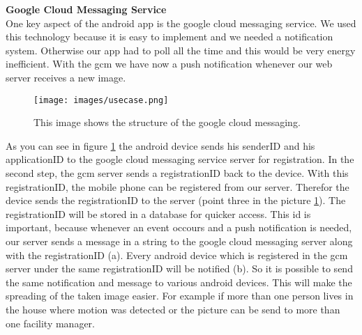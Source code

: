 \textbf{Google Cloud Messaging Service} \\
One key aspect of the android app is the google cloud messaging service. We used this technology because it is easy to implement and we needed a notification system. Otherwise our app had to poll all the time and this would be very energy inefficient. With the gcm we have now a push notification whenever our web server receives a new image.

\begin{figure}[H]
	\centering
	\texttt{[image: images/usecase.png]}
	\caption[Google Cloud Messaging]{This image shows the structure of the google cloud messaging.}
	\label{gcm}
\end{figure}

As you can see in figure \ref{gcm} the android device sends his senderID and his applicationID to the google cloud messaging service server for registration. In the second step, the gcm server sends a registrationID back to the device. With this registrationID, the mobile phone can be registered from our server. Therefor the device sends the registrationID to the server (point three in the picture \ref{gcm}). The registrationID will be stored in a database for quicker access. This id is important, because whenever an event occours and a push notification is needed, our server sends a message in a string to the google cloud messaging server along with the registrationID (a). Every android device which is registered in the gcm server under the same registrationID will be notified (b). So it is possible to send the same notification and message to various android devices. This will make the spreading of the taken image easier. For example if more than one person lives in the house where motion was detected or the picture can be send to more than one facility manager.